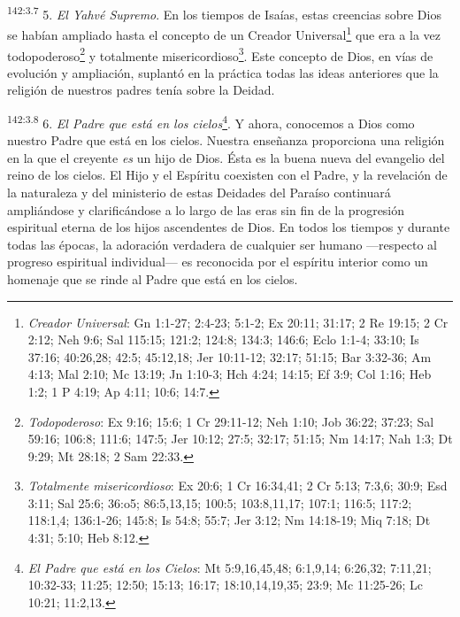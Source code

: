 \par 
\textsuperscript{142:3.7} 5. \textit{El Yahvé Supremo}. En los tiempos de Isaías, estas creencias sobre Dios se habían ampliado hasta el concepto de un Creador Universal\footnote{\textit{Creador Universal}: Gn 1:1-27; 2:4-23; 5:1-2; Ex 20:11; 31:17; 2 Re 19:15; 2 Cr 2:12; Neh 9:6; Sal 115:15; 121:2; 124:8; 134:3; 146:6; Eclo 1:1-4; 33:10; Is 37:16; 40:26,28; 42:5; 45:12,18; Jer 10:11-12; 32:17; 51:15; Bar 3:32-36; Am 4:13; Mal 2:10; Mc 13:19; Jn 1:10-3; Hch 4:24; 14:15; Ef 3:9; Col 1:16; Heb 1:2; 1 P 4:19; Ap 4:11; 10:6; 14:7.} que era a la vez todopoderoso\footnote{\textit{Todopoderoso}: Ex 9:16; 15:6; 1 Cr 29:11-12; Neh 1:10; Job 36:22; 37:23; Sal 59:16; 106:8; 111:6; 147:5; Jer 10:12; 27:5; 32:17; 51:15; Nm 14:17; Nah 1:3; Dt 9:29; Mt 28:18; 2 Sam 22:33.} y totalmente misericordioso\footnote{\textit{Totalmente misericordioso}: Ex 20:6; 1 Cr 16:34,41; 2 Cr 5:13; 7:3,6; 30:9; Esd 3:11; Sal 25:6; 36:o5; 86:5,13,15; 100:5; 103:8,11,17; 107:1; 116:5; 117:2; 118:1,4; 136:1-26; 145:8; Is 54:8; 55:7; Jer 3:12; Nm 14:18-19; Miq 7:18; Dt 4:31; 5:10; Heb 8:12.}. Este concepto de Dios, en vías de evolución y ampliación, suplantó en la práctica todas las ideas anteriores que la religión de nuestros padres tenía sobre la Deidad.

\par 
\textsuperscript{142:3.8} 6. \textit{El Padre que está en los cielos}\footnote{\textit{El Padre que está en los Cielos}: Mt 5:9,16,45,48; 6:1,9,14; 6:26,32; 7:11,21; 10:32-33; 11:25; 12:50; 15:13; 16:17; 18:10,14,19,35; 23:9; Mc 11:25-26; Lc 10:21; 11:2,13.}. Y ahora, conocemos a Dios como nuestro Padre que está en los cielos. Nuestra enseñanza proporciona una religión en la que el creyente \textit{es} un hijo de Dios. Ésta es la buena nueva del evangelio del reino de los cielos. El Hijo y el Espíritu coexisten con el Padre, y la revelación de la naturaleza y del ministerio de estas Deidades del Paraíso continuará ampliándose y clarificándose a lo largo de las eras sin fin de la progresión espiritual eterna de los hijos ascendentes de Dios. En todos los tiempos y durante todas las épocas, la adoración verdadera de cualquier ser humano ---respecto al progreso espiritual individual--- es reconocida por el espíritu interior como un homenaje que se rinde al Padre que está en los cielos.

